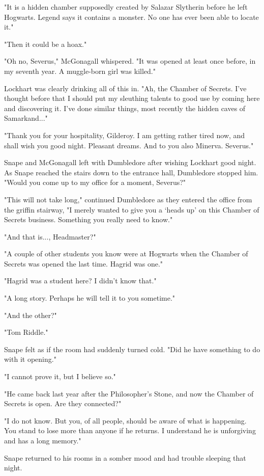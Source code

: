 \documentclass[a4paper,11pt]{article}
\begin{document}
"It is a hidden chamber supposedly created by Salazar Slytherin before he left Hogwarts. Legend says it contains a monster. No one has ever been able to locate it."

"Then it could be a hoax."

"Oh no, Severus," McGonagall whispered. "It was opened at least once before, in my seventh year. A muggle-born girl was killed."

Lockhart was clearly drinking all of this in. "Ah, the Chamber of Secrets. I've thought before that I should put my sleuthing talents to good use by coming here and discovering it. I've done similar things, most recently the hidden caves of Samarkand..."

"Thank you for your hospitality, Gilderoy. I am getting rather tired now, and shall wish you good night. Pleasant dreams. And to you also Minerva. Severus."

Snape and McGonagall left with Dumbledore after wishing Lockhart good night. As Snape reached the stairs down to the entrance hall, Dumbledore stopped him. "Would you come up to my office for a moment, Severus?"

"This will not take long," continued Dumbledore as they entered the office from the griffin stairway, "I merely wanted to give you a `heads up' on this Chamber of Secrets business. Something you really need to know."

"And that is..., Headmaster?"

"A couple of other students you know were at Hogwarts when the Chamber of Secrets was opened the last time. Hagrid was one."

"Hagrid was a student here? I didn't know that."

"A long story. Perhaps he will tell it to you sometime."

"And the other?"

"Tom Riddle."

Snape felt as if the room had suddenly turned cold. "Did he have something to do with it opening."

"I cannot prove it, but I believe so."

"He came back last year after the Philosopher's Stone, and now the Chamber of Secrets is open. Are they connected?"

"I do not know. But you, of all people, should be aware of what is happening. You stand to lose more than anyone if he returns. I understand he is unforgiving and has a long memory."

Snape returned to his rooms in a somber mood and had trouble sleeping that night.
\end{document}
